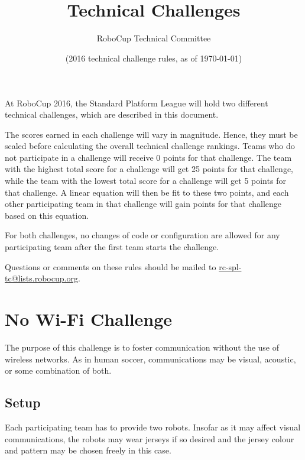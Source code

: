 \documentclass[12pt]{article}
\title{\leaguename \\ Technical Challenges}
\author{RoboCup Technical Committee}
\date{(2016 technical challenge rules, as of \today)}
\begin{document}
\maketitle

At RoboCup 2016, the Standard Platform League will hold two different technical challenges, which are described in this document.

The scores earned in each challenge will vary in magnitude.  Hence, they must be scaled before calculating the overall technical challenge rankings.  Teams who do not participate in a challenge will receive 0 points for that challenge.  The team with the highest total score for a challenge will get 25 points for that challenge, while the team with the lowest total score for a challenge will get 5 points for that challenge.  A linear equation will then be fit to these two points, and each other participating team in that challenge will gain points for that challenge based on this equation.

For both challenges, no changes of code or configuration are allowed for any participating team after the first team starts the challenge. 

Questions or comments on these rules should be mailed to {\small \url{rc-spl-tc@lists.robocup.org}}.

\vfill

\renewcommand\contentsname{Challenges}
\tableofcontents
\setcounter{tocdepth}{1}

\thispagestyle{fancy}

\clearpage

\cfoot{\thepage}
\setcounter{page}{1}

\newcommand{\openMinNum}{three}




\section{No Wi-Fi Challenge}

The purpose of this challenge is to foster communication without the use of wireless networks.
As in human soccer, communications may be visual, acoustic, or some combination of both.

\subsection{Setup}
Each participating team has to provide two robots. Insofar as it may affect visual communications,
the robots may wear jerseys if so desired and the
jersey colour and pattern may be chosen freely in this case. 
\end{document}
